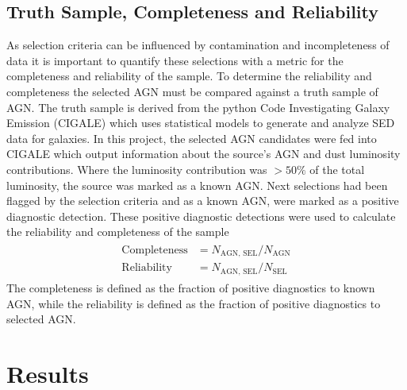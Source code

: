 \documentclass[11pt]{iopart}
\begin{document}
\subsection{Truth Sample, Completeness and Reliability}
As selection criteria can be influenced by contamination and incompleteness of data it is important to quantify these selections with a metric for the completeness and reliability of the sample. To determine the reliability and completeness the selected AGN must be compared against a truth sample of AGN. The truth sample is derived from the python Code Investigating Galaxy Emission (CIGALE) \cite{boquien_cigale_2019, yang_x-cigale_2020} which uses statistical models to generate and analyze SED data for galaxies. In this project, the selected AGN candidates were fed into CIGALE which output information about the source's AGN and dust luminosity contributions. Where the luminosity contribution was $>50\%$ of the total luminosity, the source was marked as a known AGN. Next selections had been flagged by the selection criteria and as a known AGN, were marked as a positive diagnostic detection. These positive diagnostic detections were used to calculate the reliability and completeness of the sample
\begin{align*}
    \begin{split}
        \text{Completeness} &= N_{\text{AGN, SEL} }/N_{\text{AGN}}\\
        \text{Reliability} &= N_{\text{AGN, SEL} }/N_{\text{SEL}}
    \end{split}
\end{align*}
The completeness is defined as the fraction of positive diagnostics to known AGN, while the reliability is defined as the fraction of positive diagnostics to selected AGN. 

\section{Results}
\end{document}

